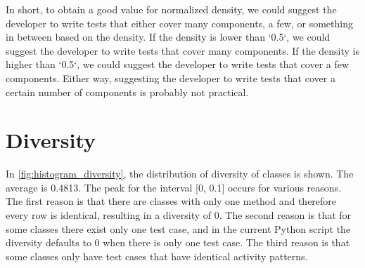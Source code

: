 \begin{table}[]
\scriptsize
\centering
\caption{My caption}
\label{my-label}
\noindent{}
\end{table}

In short, to obtain a good value for normalized density, we could suggest the developer to write tests that either cover many components, a few, or something in between based on the density.
If the density is lower than `0.5`, we could suggest the developer to write tests that cover many components.
If the density is higher than `0.5`, we could suggest the developer to write tests that cover a few components.
Either way, suggesting the developer to write tests that cover a certain number of components is probably not practical.


\section{Diversity}

In \autoref{fig:histogram_diversity}, the distribution of diversity of classes is shown.
The average is 0.4813.
The peak for the interval [0, 0.1] occurs for various reasons.
The first reason is that there are classes with only one method and therefore every row is identical, resulting in a diversity of 0.
The second reason is that for some classes there exist only one test case, and in the current Python script the diversity defaults to 0 when there is only one test case.
The third reason is that some classes only have test cases that have identical activity patterns.

